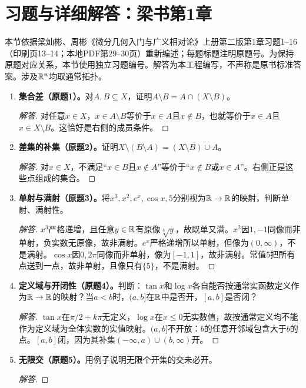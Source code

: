 \section{习题与详细解答：梁书第1章}
本节依据梁灿彬、周彬《微分几何入门与广义相对论》上册第二版第1章习题1--16（印刷页13--14；本地PDF第29--30页）重新编述；每题标题注明原题号。为保持原题对应关系，本节使用独立习题编号。解答为本工程编写，不声称是原书标准答案。涉及$\mathbb{R}^n$均取通常拓扑。
\begin{enumerate}[label=\textbf{1.\arabic*.},ref=1.\arabic*,leftmargin=*]
\item\label{ex:set-difference} \textbf{集合差（原题1）。}对$A,B\subseteq X$，证明$A\setminus B=A\cap(X\setminus B)$。
\begin{proof}[解答]
对任意$x\in X$，$x\in A\setminus B$等价于$x\in A$且$x\notin B$，也就等价于$x\in A$且$x\in X\setminus B$。这恰好是右侧的成员条件。
\end{proof}
\item \textbf{差集的补集（原题2）。}证明$X\setminus(B\setminus A)=(X\setminus B)\cup A$。
\begin{proof}[解答]
对$x\in X$，不满足“$x\in B$且$x\notin A$”等价于“$x\notin B$或$x\in A$”。右侧正是这些点组成的集合。
\end{proof}
\item \textbf{单射与满射（原题3）。}将$x^3,x^2,e^x,\cos x,5$分别视为$\mathbb{R}\to\mathbb{R}$的映射，判断单射、满射性。
\begin{proof}[解答]
$x^3$严格递增，且任意$y\in\mathbb{R}$有原像$\sqrt[3]y$，故既单又满。$x^2$因$1,-1$同像而非单射，负实数无原像，故非满射。$e^x$严格递增所以单射，但像为$(0,\infty)$，不是满射。$\cos x$因$0,2\pi$同像而非单射，像为$[-1,1]$，故非满射。常值$5$把所有点送到一点，故非单射，且像只有$\{5\}$，不是满射。
\end{proof}
\item \textbf{定义域与开闭性（原题4）。}判断：$\tan x$和$\log x$各自能否按通常实函数定义作为$\mathbb{R}\to\mathbb{R}$的映射？当$a<b$时，$(a,b]$在$\mathbb{R}$中是否开，$[a,b]$是否闭？
\begin{proof}[解答]
$\tan x$在$\pi/2+k\pi$无定义，$\log x$在$x\leq0$无实数值，故按通常定义均不能作为定义域为全体实数的实值映射。$(a,b]$不开放：$b$的任意开邻域包含大于$b$的点。$[a,b]$闭，因为其补集$(-\infty,a)\cup(b,\infty)$开。
\end{proof}
\item \textbf{无限交（原题5）。}用例子说明无限个开集的交未必开。
\begin{proof}[解答]

\end{proof}
\end{enumerate}

